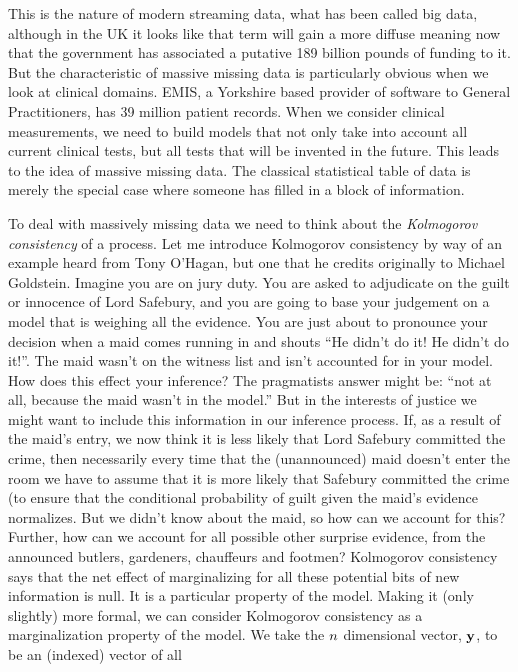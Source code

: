 \documentclass[a4paperpaper,]{article}
\begin{document}
This is the nature of modern streaming data, what has been called big
data, although in the UK it looks like that term will gain a more
diffuse meaning now that the government has associated a putative 189
billion pounds of funding to it. But the characteristic of massive
missing data is particularly obvious when we look at clinical domains.
EMIS, a Yorkshire based provider of software to General Practitioners,
has 39 million patient records. When we consider clinical measurements,
we need to build models that not only take into account all current
clinical tests, but all tests that will be invented in the future. This
leads to the idea of massive missing data. The classical statistical
table of data is merely the special case where someone has filled in a
block of information.

To deal with massively missing data we need to think about the
\emph{Kolmogorov consistency} of a process. Let me introduce Kolmogorov
consistency by way of an example heard from Tony O'Hagan, but one that
he credits originally to Michael Goldstein. Imagine you are on jury
duty. You are asked to adjudicate on the guilt or innocence of Lord
Safebury, and you are going to base your judgement on a model that is
weighing all the evidence. You are just about to pronounce your decision
when a maid comes running in and shouts ``He didn't do it! He didn't do
it!''. The maid wasn't on the witness list and isn't accounted for in
your model. How does this effect your inference? The pragmatists answer
might be: ``not at all, because the maid wasn't in the model.'' But in
the interests of justice we might want to include this information in
our inference process. If, as a result of the maid's entry, we now think
it is less likely that Lord Safebury committed the crime, then
necessarily every time that the (unannounced) maid doesn't enter the
room we have to assume that it is more likely that Safebury committed
the crime (to ensure that the conditional probability of guilt given the
maid's evidence normalizes. But we didn't know about the maid, so how
can we account for this? Further, how can we account for all possible
other surprise evidence, from the announced butlers, gardeners,
chauffeurs and footmen? Kolmogorov consistency says that the net effect
of marginalizing for all these potential bits of new information is
null. It is a particular property of the model. Making it (only
slightly) more formal, we can consider Kolmogorov consistency as a
marginalization property of the model. We take the \(n\)
dimensional vector, \(\mathbf{ y}\), to be an (indexed) vector of all
\end{document}
